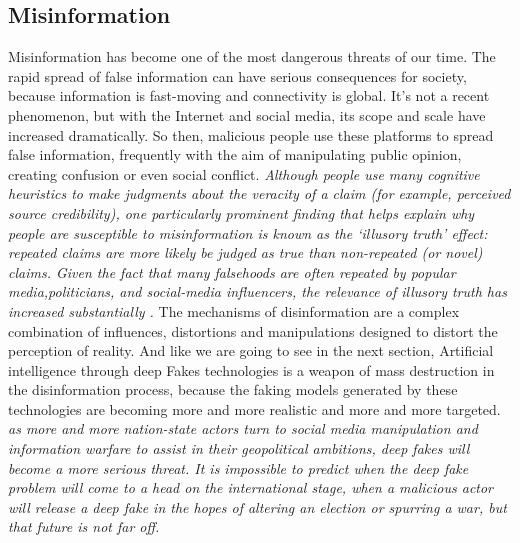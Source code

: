 \subsection{Misinformation}
Misinformation has become one of the most dangerous threats of our time. The rapid spread of false information can have serious consequences for society, because information is fast-moving and connectivity is global. It's not a recent phenomenon, but with the Internet and social media, its scope and scale have increased dramatically. So then, malicious people use these platforms to spread false information, frequently with the aim of manipulating public opinion, creating confusion or even social conflict. \emph{Although people use many cognitive heuristics to make judgments about the veracity of a claim (for example, perceived source credibility), one particularly prominent finding that helps explain why people are susceptible to misinformation is known as the ‘illusory truth’ effect: repeated claims are more likely be judged as true than non-repeated (or novel) claims. Given the fact that many falsehoods are often repeated by popular media,politicians, and social-media influencers, the relevance of illusory truth has increased substantially \cite{vanderlindenMisinformationSusceptibilitySpread2022}.} The mechanisms of disinformation are a complex combination of influences, distortions and manipulations designed to distort the perception of reality. And like we are going to see in the next section, Artificial intelligence through deep Fakes technologies is a weapon of mass destruction in the disinformation process, because the faking models generated by these technologies are becoming more and more realistic and more and more targeted. \emph{as more and more nation-state actors turn to social media manipulation and information warfare to assist in their geopolitical ambitions, deep fakes will become a more serious threat. It is impossible to predict when the deep fake problem will come to a head on the international stage, when a malicious actor will release a deep fake in the hopes of altering an election or spurring a war, but that future is not far off. \cite{jlbeyerDeepFakesFake2019}}
